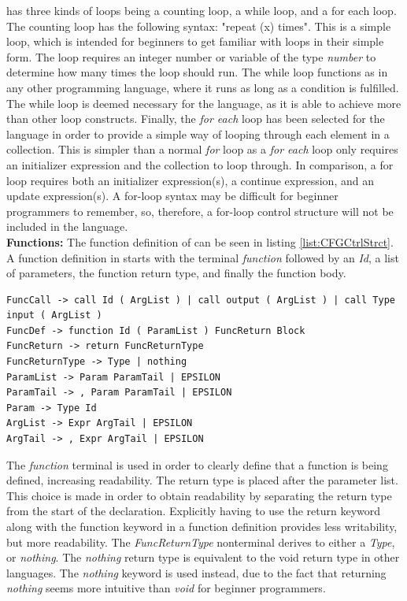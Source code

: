\lang has three kinds of loops being a counting loop, a while loop, and a for each loop. The counting loop has the following syntax: "repeat (x) times{}". This is a simple loop, which is intended for beginners to get familiar with loops in their simple form. The loop requires an integer number or variable of the type \textit{number} to determine how many times the loop should run. The while loop functions as in any other programming language, where it runs as long as a condition is fulfilled. The while loop is deemed necessary for the language, as it is able to achieve more than other loop constructs. Finally, the \textit{for each} loop has been selected for the \lang language in order to provide a simple way of looping through each element in a collection. This is simpler than a normal \textit{for} loop as a \textit{for each} loop only requires an initializer expression and the collection to loop through. In comparison, a for loop requires both an initializer expression(s), a continue expression, and an update expression(s). A for-loop syntax may be difficult for beginner programmers to remember, so, therefore, a for-loop control structure will not be included in the language. \\

\textbf{Functions: } The function definition of \lang can be seen in listing \ref{list:CFGCtrlStrct}. A function definition in \lang starts with the terminal \textit{function} followed by an \textit{Id}, a list of parameters, the function return type, and finally the function body. 

\begin{lstlisting}[language=scriptkid, label={list:CFGFunction},caption=Function call \& declaration of \lang CFG]
FuncCall -> call Id ( ArgList ) | call output ( ArgList ) | call Type input ( ArgList ) 
FuncDef -> function Id ( ParamList ) FuncReturn Block   
FuncReturn -> return FuncReturnType   
FuncReturnType -> Type | nothing   
ParamList -> Param ParamTail | EPSILON   
ParamTail -> , Param ParamTail | EPSILON   
Param -> Type Id   
ArgList -> Expr ArgTail | EPSILON   
ArgTail -> , Expr ArgTail | EPSILON   

\end{lstlisting}

The \textit{function} terminal is used in order to clearly define that a function is being defined, increasing readability. The return type is placed after the parameter list. This choice is made in order to obtain readability by separating the return type from the start of the declaration. Explicitly having to use the return keyword along with the function keyword in a function definition provides less writability, but more readability. 
The \textit{FuncReturnType} nonterminal derives to either a \textit{Type}, or \textit{nothing}. The \textit{nothing} return type is equivalent to the void return type in other languages. The \textit{nothing} keyword is used instead, due to the fact that returning \textit{nothing} seems more intuitive than \textit{void} for beginner programmers. 


